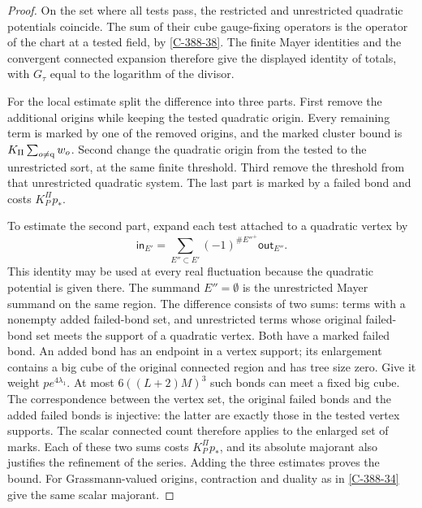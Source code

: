 \documentclass[11pt,letterpaper,reqno]{amsart}
\theoremstyle{definition}
\theoremstyle{remark}
\begin{document}
\begin{proof}
On the set where all tests pass, the restricted and
unrestricted quadratic potentials coincide.  The sum of
their cube gauge-fixing operators is the operator of the
chart at a tested field, by \cref{C-388-38}.  The finite
Mayer identities and the convergent connected expansion
therefore give the displayed identity of totals, with
$G_\tau$ equal to the logarithm of the divisor.

For the local estimate split the difference into three
parts.  First remove the additional origins while keeping
the tested quadratic origin.  Every remaining term is
marked by one of the removed origins, and the marked
cluster bound is $K_\Pi\sum_{o\ne{\rm q}}w_o$.
Second change the quadratic origin from the tested to
the unrestricted sort, at the same finite threshold.
Third remove the threshold from that unrestricted
quadratic system.  The last part is marked by a failed
bond and costs $K_P^\Pi p_*$.

To estimate the second part, expand each test attached to
a quadratic vertex by
\[
 \mathsf{in}_{E'}=\sum_{E''\subset E'}
                  (-1)^{\#E''^+}\mathsf{out}_{E''}.
\]
This identity may be used at every real fluctuation because
the quadratic potential is given there.  The summand
$E''=\emptyset$ is the unrestricted Mayer summand on the
same region.  The difference consists of two sums: terms
with a nonempty added failed-bond set, and unrestricted
terms whose original failed-bond set meets the support
of a quadratic vertex.  Both have a marked failed bond.
An added bond has an endpoint in a vertex support; its
enlargement contains a big cube of the original connected
region and has tree size zero.  Give it weight
$pe^{4\lambda_1}$.  At most $6((L+2)M)^3$ such bonds
can meet a fixed big cube.  The correspondence between
the vertex set, the original failed bonds and the added
failed bonds is injective: the latter are exactly those
in the tested vertex supports.  The scalar connected
count therefore applies to the enlarged set of marks.
Each of these two sums costs $K_P^\Pi p_*$, and its
absolute majorant also justifies the refinement of the
series.  Adding the three estimates proves the bound.
For Grassmann-valued origins, contraction and duality as
in \cref{C-388-34} give the same scalar majorant.
\end{proof}
\end{document}
